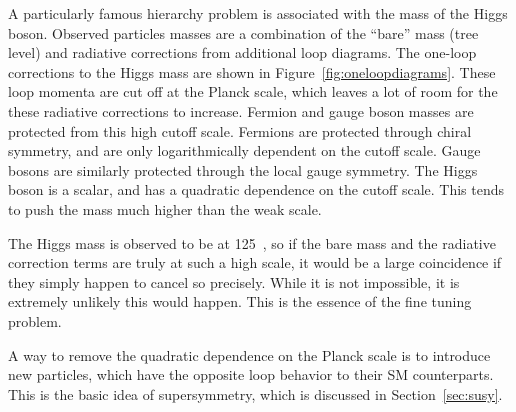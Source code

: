 A particularly famous hierarchy problem is associated with the mass of the
Higgs boson.
Observed particles masses are a combination of the ``bare'' mass (tree level)
and radiative corrections from additional loop diagrams.
The one-loop corrections to the Higgs mass are shown in
Figure~\ref{fig:oneloopdiagrams}.
These loop momenta are cut off at the Planck scale, which leaves a lot of room
for the these radiative corrections to increase.
Fermion and gauge boson masses are protected from this high cutoff scale.
Fermions are protected through chiral symmetry, and are only logarithmically
dependent on the cutoff scale. 
Gauge bosons are similarly protected through the local gauge symmetry.
The Higgs boson is a scalar, and has a quadratic dependence on the cutoff
scale.
This tends to push the mass much higher than the weak scale.

The Higgs mass is observed to be at 125~\GeV, so if the bare mass and the
radiative correction terms are truly at such a high scale, it would be a large
coincidence if they simply happen to cancel so precisely.
While it is not impossible, it is extremely unlikely this would happen.
This is the essence of the fine tuning problem.

A way to remove the quadratic dependence on the Planck scale is to introduce
new particles, which have the opposite loop behavior to their SM counterparts.
This is the basic idea of supersymmetry, which is discussed in
Section~\ref{sec:susy}.

